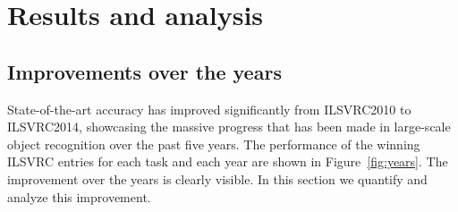 
\section{Results and analysis}
\label{sec:Results}



\subsection{Improvements over the years}
\label{sec:ResultsYears}

State-of-the-art accuracy has improved significantly from ILSVRC2010 to ILSVRC2014, showcasing the massive progress that has been made in large-scale object recognition over the past five years. The performance of the winning ILSVRC entries for each task and each year are shown in Figure~\ref{fig:years}. The improvement over the years is clearly visible. In this section we quantify and analyze this improvement. 



